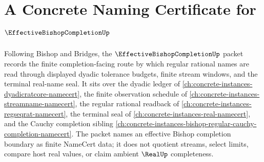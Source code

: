 \chapter{A Concrete Naming Certificate for $\EffectiveBishopCompletionUp$}
\label{ch:concrete-instances-effective-bishop-completion-namecert}

Following Bishop and Bridges, the $\EffectiveBishopCompletionUp$ packet records the finite completion-facing route by which regular rational names are read through displayed dyadic tolerance budgets, finite stream windows, and the terminal real-name seal. It sits over the dyadic ledger of \autoref{ch:concrete-instances-dyadicratcore-namecert}, the finite observation schedule of \autoref{ch:concrete-instances-streamname-namecert}, the regular rational readback of \autoref{ch:concrete-instances-regseqrat-namecert}, the terminal seal of \autoref{ch:concrete-instances-real-namecert}, and the Cauchy completion sibling \autoref{ch:concrete-instances-bishop-regular-cauchy-completion-namecert}. The packet names an effective Bishop completion boundary as finite NameCert data; it does not quotient streams, select limits, compare host real values, or claim ambient $\RealUp$ completeness.

